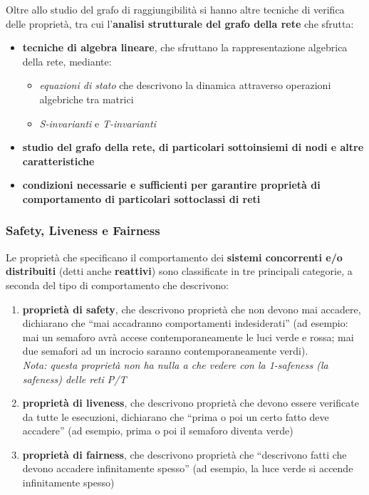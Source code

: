 \documentclass[a4paper,12pt, oneside]{book}
\begin{document}
\newpage
Oltre allo studio del grafo di raggiungibilità si hanno altre tecniche di
verifica delle proprietà, tra cui l'\textbf{analisi strutturale del grafo della
  rete} che sfrutta: 
\begin{itemize}
  \item \textbf{tecniche di algebra lineare}, che sfruttano la rappresentazione
  algebrica della rete, mediante:
  \begin{itemize}
    \item \textit{equazioni di stato} che descrivono la dinamica attraverso
    operazioni algebriche tra matrici
    \item \textit{S-invarianti} e \textit{T-invarianti}
  \end{itemize}
  \item \textbf{studio del grafo della rete, di particolari sottoinsiemi di
    nodi e altre caratteristiche}
  \item \textbf{condizioni necessarie e sufficienti per garantire proprietà di
    comportamento di particolari sottoclassi di reti} 
\end{itemize}
\subsubsection{Safety, Liveness e Fairness}
Le proprietà che specificano il comportamento dei \textbf{sistemi concorrenti
  e/o distribuiti} (detti anche \textbf{reattivi}) sono classificate in tre
principali categorie, a seconda del tipo di comportamento che descrivono:
\begin{enumerate}
  \item \textbf{proprietà di safety}, che descrivono proprietà che non devono
  mai accadere, dichiarano che ``mai accadranno comportamenti indesiderati''
  (ad esempio: mai un semaforo avrà accese contemporaneamente le luci
  verde e rossa; mai due semafori ad un incrocio saranno contemporaneamente
  verdi). \\\textit{Nota: questa proprietà non ha nulla a che vedere con la
    \emph{1-safeness} (la \emph{safeness}) delle reti P/T}
  \item \textbf{proprietà di liveness}, che descrivono proprietà che devono
  essere verificate da tutte le esecuzioni, dichiarano che ``prima o poi un
  certo fatto deve accadere'' (ad esempio, prima o poi il semaforo diventa
  verde) 
  \item \textbf{proprietà di fairness}, che descrivono proprietà che
  ``descrivono fatti che devono accadere infinitamente spesso'' (ad esempio, la
  luce verde si accende infinitamente spesso)
\end{enumerate}
\end{document}
